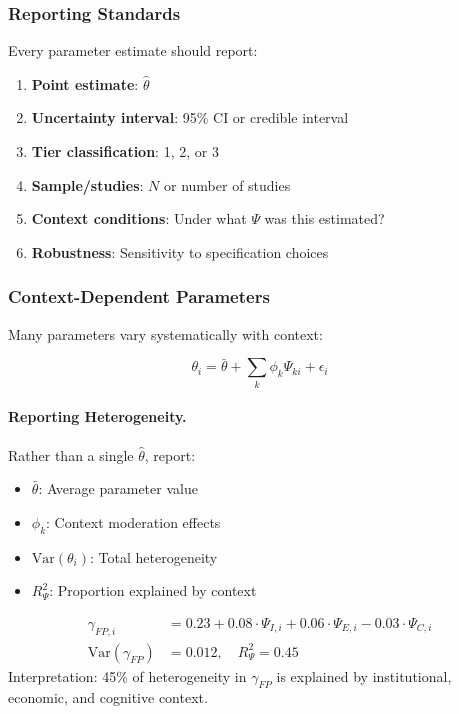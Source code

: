\subsubsection{Reporting Standards}

Every parameter estimate should report:

\begin{enumerate}
    \item \textbf{Point estimate}: $\hat{\theta}$
    \item \textbf{Uncertainty interval}: 95\% CI or credible interval
    \item \textbf{Tier classification}: 1, 2, or 3
    \item \textbf{Sample/studies}: $N$ or number of studies
    \item \textbf{Context conditions}: Under what $\Psi$ was this estimated?
    \item \textbf{Robustness}: Sensitivity to specification choices
\end{enumerate}

\subsubsection{Context-Dependent Parameters}

Many parameters vary systematically with context:

\begin{equation}
\theta_i = \bar{\theta} + \sum_k \phi_k \Psi_{ki} + \epsilon_i
\end{equation}

\paragraph{Reporting Heterogeneity.}

Rather than a single $\hat{\theta}$, report:
\begin{itemize}
    \item $\bar{\theta}$: Average parameter value
    \item $\phi_k$: Context moderation effects
    \item $\text{Var}(\theta_i)$: Total heterogeneity
    \item $R^2_{\Psi}$: Proportion explained by context
\end{itemize}

\begin{example}
\begin{align}
\gamma_{FP,i} &= 0.23 + 0.08 \cdot \Psi_{I,i} + 0.06 \cdot \Psi_{E,i} - 0.03 \cdot \Psi_{C,i} \\
\text{Var}(\gamma_{FP}) &= 0.012, \quad R^2_{\Psi} = 0.45
\end{align}
Interpretation: 45\% of heterogeneity in $\gamma_{FP}$ is explained by institutional, 
economic, and cognitive context.
\end{example}

